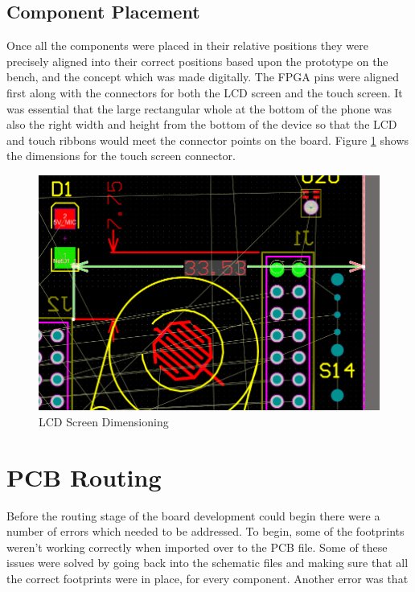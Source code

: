 \subsection{Component Placement}
	Once all the components were placed in their relative positions they were precisely aligned into their correct positions based upon the prototype on the bench, and the concept which was made digitally. The FPGA pins were aligned first along with the connectors for both the LCD screen and the touch screen. It was essential that the large rectangular whole at the bottom of the phone was also the right width and height from the bottom of the device so that the LCD and touch ribbons would meet the connector points on the board. Figure \ref{fig:component_placement} shows the dimensions for the touch screen connector. 

\begin{figure}
	\includegraphics[width=\linewidth]{Figures/component_placement.png}\centering
	\caption{LCD Screen Dimensioning}
	\label{fig:component_placement}
\end{figure}


\section{PCB Routing}
\label{chap6sec6}

	Before the routing stage of the board development could begin there were a number of errors which needed to be addressed. To begin, some of the footprints weren't working correctly when imported over to the PCB file. Some of these issues were solved by going back into the schematic files and making sure that all the correct footprints were in place, for every component. Another error was that 

